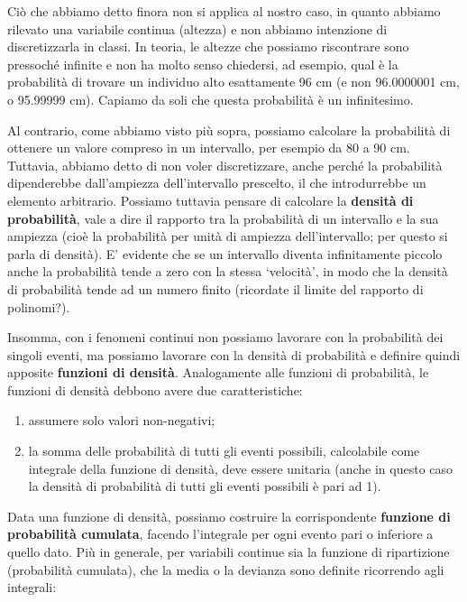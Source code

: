 \documentclass[a4paper,12pt,oneside]{book}
\providecommand{\tightlist}{%
  \setlength{\itemsep}{0pt}\setlength{\parskip}{0pt}}
\begin{document}
Ciò che abbiamo detto finora non si applica al nostro caso, in quanto abbiamo rilevato una variabile continua (altezza) e non abbiamo intenzione di discretizzarla in classi. In teoria, le altezze che possiamo riscontrare sono pressoché infinite e non ha molto senso chiedersi, ad esempio, qual è la probabilità di trovare un individuo alto esattamente 96 cm (e non 96.0000001 cm, o 95.99999 cm). Capiamo da soli che questa probabilità è un infinitesimo.

Al contrario, come abbiamo visto più sopra, possiamo calcolare la probabilità di ottenere un valore compreso in un intervallo, per esempio da 80 a 90 cm. Tuttavia, abbiamo detto di non voler discretizzare, anche perché la probabilità dipenderebbe dall'ampiezza dell'intervallo prescelto, il che introdurrebbe un elemento arbitrario. Possiamo tuttavia pensare di calcolare la \textbf{densità di probabilità}, vale a dire il rapporto tra la probabilità di un intervallo e la sua ampiezza (cioè la probabilità per unità di ampiezza dell'intervallo; per questo si parla di densità). E' evidente che se un intervallo diventa infinitamente piccolo anche la probabilità tende a zero con la stessa `velocità', in modo che la densità di probabilità tende ad un numero finito (ricordate il limite del rapporto di polinomi?).

Insomma, con i fenomeni continui non possiamo lavorare con la probabilità dei singoli eventi, ma possiamo lavorare con la densità di probabilità e definire quindi apposite \textbf{funzioni di densità}. Analogamente alle funzioni di probabilità, le funzioni di densità debbono avere due caratteristiche:

\begin{enumerate}
\def\labelenumi{\arabic{enumi}.}
\tightlist
\item
  assumere solo valori non-negativi;
\item
  la somma delle probabilità di tutti gli eventi possibili, calcolabile come integrale della funzione di densità, deve essere unitaria (anche in questo caso la densità di probabilità di tutti gli eventi possibili è pari ad 1).
\end{enumerate}

Data una funzione di densità, possiamo costruire la corrispondente \textbf{funzione di probabilità cumulata}, facendo l'integrale per ogni evento pari o inferiore a quello dato. Più in generale, per variabili continue sia la funzione di ripartizione (probabilità cumulata), che la media o la devianza sono definite ricorrendo agli integrali:
\end{document}

